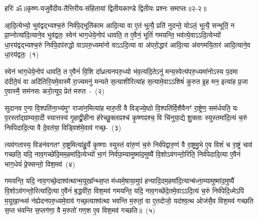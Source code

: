 {\anuvakamend[जि॒नोषि॑ देभुः॒ प्र ह॒व्यं ब॒भूथ॒ मा याभि॑श्चत्वारि॒ꣳ॒शच्च॑]}

{हरिः॑ ॐ}{॥कृष्ण-यजुर्वेदीय-तैत्तिरीय-संहितायां द्वितीयकाण्डे द्वितीयः प्रश्नः समाप्तः॥२-२॥}



\setcounter{anuvakam}{0}
आ॒दि॒त्येभ्यो॒ भुव॑द्वद्भ्यश्च॒रुं निर्व॑पे॒द्भूति॑काम आदि॒त्या वा ए॒तं भूत्यै॒ प्रति॑ नुदन्ते॒ यो\-ऽलं॒ भूत्यै॒ सन्भूतिं॒ न प्रा॒प्नोत्या॑दि॒त्याने॒व भुव॑द्वतः॒ स्वेन॑ भाग॒\-धेये॒नोप॑ धावति॒ त ए॒वैनं॒ भूतिं॑ गमयन्ति॒ भव॑त्ये॒वा\-ऽऽ\-दि॒त्येभ्यो॑ धा॒रय॑द्वद्भ्यश्च॒रुं निर्व॑पे॒दप॑रुद्धो वा\-ऽपरु॒ध्यमा॑नो वा\-ऽऽ\-दि॒त्या वा अ॑परो॒द्धार॑ आदि॒त्या अ॑वगमयि॒तार॑ आदि॒त्याने॒व धा॒रय॑द्वतः॒~(१)\ip

स्वेन॑ भाग॒\-धेये॒नोप॑ धावति॒ त ए॒वैनं॑ वि॒शि दा᳚ध्रत्यनपरु॒ध्यो भ॑व॒त्यदि॒ते\-ऽनु॑ मन्य॒स्वेत्य॑परु॒ध्यमा॑नो\-ऽस्य प॒दमा द॑दीते॒यं वा अदि॑तिरि॒यमे॒वास्मै॑ रा॒ज्यमनु॑ मन्यते स॒त्याशीरित्या॑ह स॒त्यामे॒वा\-ऽऽ\-शिषं॑ कुरुत इ॒ह मन॒ इत्या॑ह प्र॒जा ए॒वास्मै॒ सम॑नसः करो॒त्युप॒ प्रेत॑ मरुत~-~(२)\ip

सुदानव ए॒ना वि॒श्पति॑ना॒भ्य॑मुꣳ राजा॑न॒मित्या॑ह मारु॒ती वै विड्ज्ये॒ष्ठो वि॒श्पति॑र्वि॒शैवैनꣳ॑ रा॒ष्ट्रेण॒ सम॑र्धयति॒ यः प॒रस्ता᳚द्ग्राम्यवा॒दी स्यात्तस्य॑ गृ॒हाद्व्री॒हीना ह॑रेच्छु॒क्लाꣴश्च॑ कृ॒ष्णाꣴश्च॒ वि चि॑नुया॒द्ये शु॒क्लाः स्युस्तमा॑दि॒त्यं च॒रुं निर्व॑पेदादि॒त्या वै दे॒वत॑या॒ विड्विश॑मे॒वाव॑ \mbox{गच्छ॒-~(३)\ip}

त्यव॑गतास्य॒ विडन॑वगतꣳ रा॒ष्ट्रमित्या॑हु॒र्ये कृ॒ष्णाः स्युस्तं वा॑रु॒णं च॒रुं निर्व॑पेद्वारु॒णं वै रा॒ष्ट्रमु॒भे ए॒व विशं॑ च रा॒ष्ट्रं चाव॑ गच्छति॒ यदि॒ नाव॒गच्छे॑दि॒मम॒हमा॑दि॒त्येभ्यो॑ भा॒गं निर्व॑पा॒म्यामुष्मा॑द॒मुष्यै॑ वि॒शो\-ऽव॑गन्तो॒रिति॒ निर्व॑पेदादि॒त्या ए॒वैनं॑ भाग॒\-धेयं॑ प्रे॒फ्सन्तो॒ विश॒मव॑~(४)\ip

गमयन्ति॒ यदि॒ नाव॒गच्छे॒दाश्व॑त्थान्म॒यूखा᳚न्थ्स॒प्त म॑ध्यमे॒षाया॒मुप॑ हन्या\-दि॒द\-म॒हमा॑\-दि॒त्यान्ब॑ध्ना॒म्यामुष्मा॑\-द॒मुष्यै॑ वि॒शो\-ऽव॑गन्तो॒रित्या॑\-दि॒त्या ए॒वैनं॑ ब॒द्धवी॑रा॒ विश॒मव॑ गमयन्ति॒ यदि॒ नाव॒गच्छे॑दे॒तमे॒वा\-ऽऽ\-दि॒त्यं च॒रुं निर्व॑पेदि॒ध्मे\-ऽपि॑ म॒यूखा॒न्थ्सं न॑ह्येदनपरु॒ध्यमे॒वाव॑ गच्छ॒त्याश्व॑त्था भवन्ति म॒रुतां॒ वा ए॒तदोजो॒ यद॑श्व॒त्थ ओज॑सै॒व विश॒मव॑ गच्छति स॒प्त भ॑वन्ति स॒प्तग॑णा॒ वै म॒रुतो॑ गण॒श ए॒व विश॒मव॑ गच्छति॥~(५)\ip

